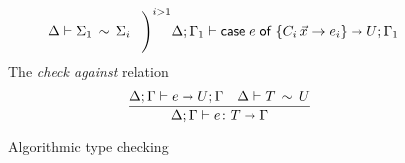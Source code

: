 \begin{figure}[h!]
\begin{gather*}
{\begin{array}{c}
                \ctxequiv{\Sigma_1}{\Sigma_i} 
              \end{array}
              \;\Bigg)^{i>1}
            }{
              \algtypeout[\kindEnv;\varEnv_1]{\casee{e}{\{C_i\,\vec x\rightarrow e_i\}}}{U}{\varEnv_1}
            }
\end{gather*}
% 
% 
The \emph{check against} relation\hfill{}
\begin{gather*}
  \frac{
    \algtypeout e U \varEnv
    \quad
    \typeequiv T U
  }{
    \algtypein e T \varEnv
  }
\end{gather*}
\caption{Algorithmic type checking}
\label{fig:alg-typing}
\end{figure}

